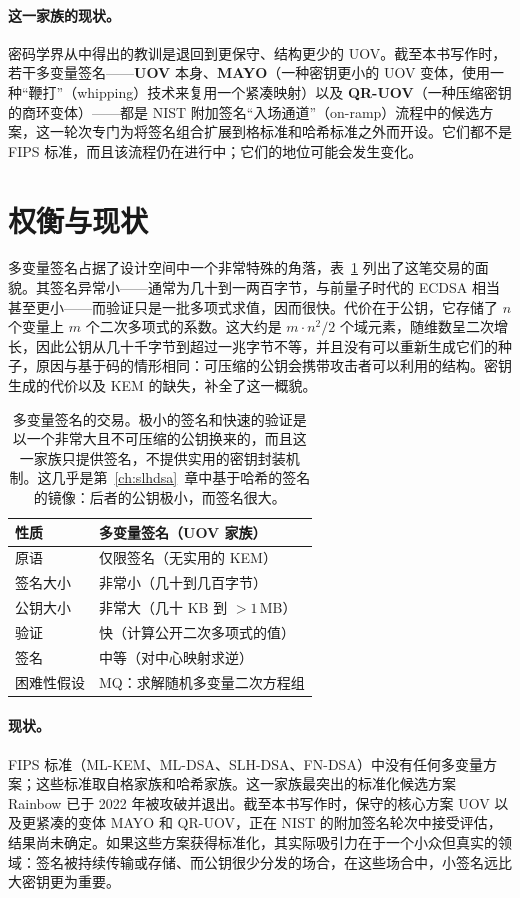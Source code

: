 \paragraph{这一家族的现状。}
密码学界从中得出的教训是退回到更保守、结构更少的 UOV。截至本书写作时，若干多变量签名——\textbf{UOV} 本身、\textbf{MAYO}（一种密钥更小的 UOV 变体，使用一种“鞭打”（whipping）技术来复用一个紧凑映射）以及 \textbf{QR-UOV}（一种压缩密钥的商环变体）——都是 NIST 附加签名“入场通道”（on-ramp）流程中的候选方案，这一轮次专门为将签名组合扩展到格标准和哈希标准之外而开设。它们都不是 FIPS 标准，而且该流程仍在进行中；它们的地位可能会发生变化。

\section{权衡与现状}

多变量签名占据了设计空间中一个非常特殊的角落，表~\ref{tab:mv-tradeoffs} 列出了这笔交易的面貌。其签名异常小——通常为几十到一两百字节，与前量子时代的 ECDSA 相当甚至更小——而验证只是一批多项式求值，因而很快。代价在于公钥，它存储了 $n$ 个变量上 $m$ 个二次多项式的系数。这大约是 $m \cdot n^2 / 2$ 个域元素，随维数呈二次增长，因此公钥从几十千字节到超过一兆字节不等，并且没有可以重新生成它们的种子，原因与基于码的情形相同：可压缩的公钥会携带攻击者可以利用的结构。密钥生成的代价以及 KEM 的缺失，补全了这一概貌。

\begin{table}[H]
\centering
\begin{tabular}{ll}
\toprule
性质 & 多变量签名（UOV 家族） \\
\midrule
原语          & 仅限签名（无实用的 KEM） \\
签名大小     & 非常小（几十到几百字节） \\
公钥大小    & 非常大（几十 KB 到 $>1$\,MB） \\
验证       & 快（计算公开二次多项式的值） \\
签名            & 中等（对中心映射求逆） \\
困难性假设 & MQ：求解随机多变量二次方程组 \\
\bottomrule
\end{tabular}
\caption{多变量签名的交易。极小的签名和快速的验证是以一个非常大且不可压缩的公钥换来的，而且这一家族只提供签名，不提供实用的密钥封装机制。这几乎是第~\ref{ch:slhdsa}~章中基于哈希的签名的镜像：后者的公钥极小，而签名很大。}
\label{tab:mv-tradeoffs}
\end{table}

\paragraph{现状。}
FIPS 标准（ML-KEM、ML-DSA、SLH-DSA、FN-DSA）中没有任何多变量方案；这些标准取自格家族和哈希家族。这一家族最突出的标准化候选方案 Rainbow 已于 2022 年被攻破并退出。截至本书写作时，保守的核心方案 UOV 以及更紧凑的变体 MAYO 和 QR-UOV，正在 NIST 的附加签名轮次中接受评估，结果尚未确定。如果这些方案获得标准化，其实际吸引力在于一个小众但真实的领域：签名被持续传输或存储、而公钥很少分发的场合，在这些场合中，小签名远比大密钥更为重要。

